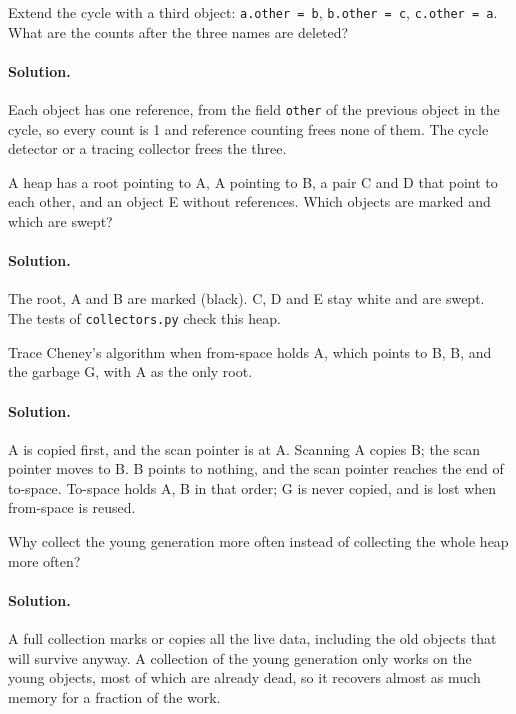 \begin{exercise}
Extend the cycle with a third object: \texttt{a.other = b},
\texttt{b.other = c}, \texttt{c.other = a}. What are the counts after the three
names are deleted?
\end{exercise}

\paragraph{Solution.} Each object has one reference, from the field
\texttt{other} of the previous object in the cycle, so every count is 1 and
reference counting frees none of them. The cycle detector or a tracing
collector frees the three.

\begin{exercise}
A heap has a root pointing to A, A pointing to B, a pair C and D that point to
each other, and an object E without references. Which objects are marked and
which are swept?
\end{exercise}

\paragraph{Solution.} The root, A and B are marked (black). C, D and E stay white and
are swept. The tests of \texttt{collectors.py} check this heap.

\begin{exercise}
Trace Cheney's algorithm when from-space holds A, which points to B, B, and
the garbage G, with A as the only root.
\end{exercise}

\paragraph{Solution.} A is copied first, and the scan pointer is at A. Scanning A
copies B; the scan pointer moves to B. B points to nothing, and the scan
pointer reaches the end of to-space. To-space holds A, B in that order; G is
never copied, and is lost when from-space is reused.

\begin{exercise}
Why collect the young generation more often instead of collecting the whole
heap more often?
\end{exercise}

\paragraph{Solution.} A full collection marks or copies all the live data, including
the old objects that will survive anyway. A collection of the young
generation only works on the young objects, most of which are already dead, so
it recovers almost as much memory for a fraction of the work.
